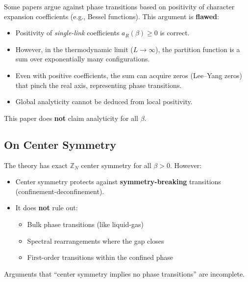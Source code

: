 \begin{remark}
\label{rem:analyticity}
Some papers argue against phase transitions based on positivity of character 
expansion coefficients (e.g., Bessel functions). This argument is \textbf{flawed}:

\begin{itemize}
    \item Positivity of \emph{single-link} coefficients $a_R(\beta) \geq 0$ is correct.
    \item However, in the thermodynamic limit ($L \to \infty$), the partition function 
    is a sum over exponentially many configurations.
    \item Even with positive coefficients, the sum can acquire zeros (Lee--Yang zeros) 
    that pinch the real axis, representing phase transitions.
    \item Global analyticity cannot be deduced from local positivity.
\end{itemize}

This paper does \textbf{not} claim analyticity for all $\beta$.
\end{remark}

\subsection{On Center Symmetry}

\begin{remark}
\label{rem:center-symmetry}
The theory has exact $\mathbb{Z}_N$ center symmetry for all $\beta > 0$. However:

\begin{itemize}
    \item Center symmetry protects against \textbf{symmetry-breaking} transitions 
    (confinement-deconfinement).
    \item It does \textbf{not} rule out:
    \begin{itemize}
        \item Bulk phase transitions (like liquid-gas)
        \item Spectral rearrangements where the gap closes
        \item First-order transitions within the confined phase
    \end{itemize}
\end{itemize}

Arguments that ``center symmetry implies no phase transitions'' are incomplete.
\end{remark}

